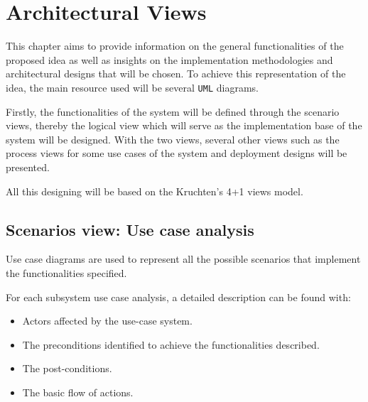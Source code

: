 \section{Architectural Views}
This chapter aims to provide information on the general functionalities of the proposed idea 
as well as insights on the implementation methodologies and architectural designs that will be chosen. 
To achieve this representation of the idea, the main resource used will be several \texttt{UML} diagrams.

Firstly, the functionalities of the system will be defined through the scenario views, thereby the logical 
view which will serve as the implementation base of the system will be designed. 
With the two views, several other views such as the process views for some use cases of the system and 
deployment designs will be presented.

All this designing will be based on the Kruchten’s 4+1 views model\cite{ArchitecturalBlueprints4+1}.

\subsection{Scenarios view: Use case analysis}

Use case diagrams are used to represent all the possible scenarios that implement the functionalities specified.

For each subsystem use case analysis, a detailed description can be found with:
\begin{itemize}
    \item Actors affected by the use-case system.
    \item The preconditions identified to achieve the functionalities described.
    \item The post-conditions.
    \item The basic flow of actions.
\end{itemize}

